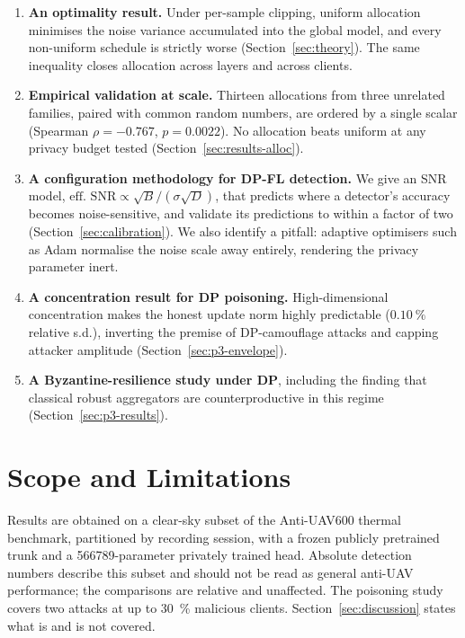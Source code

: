 \begin{enumerate}
  \item \textbf{An optimality result.} Under per-sample clipping, uniform
  allocation minimises the noise variance accumulated into the global model, and
  every non-uniform schedule is strictly worse (Section~\ref{sec:theory}). The
  same inequality closes allocation across layers and across clients.

  \item \textbf{Empirical validation at scale.} Thirteen allocations from three
  unrelated families, paired with common random numbers, are ordered by a single
  scalar (Spearman $\rho=-0.767$, $p=0.0022$). No allocation beats uniform at any
  privacy budget tested (Section~\ref{sec:results-alloc}).

  \item \textbf{A configuration methodology for DP-FL detection.} We give an
  SNR model, $\text{eff.\ SNR}\propto \sqrt{B}/(\sigma\sqrt{D})$, that predicts
  where a detector's accuracy becomes noise-sensitive, and validate its
  predictions to within a factor of two (Section~\ref{sec:calibration}). We also
  identify a pitfall: adaptive optimisers such as Adam normalise the noise scale
  away entirely, rendering the privacy parameter inert.

  \item \textbf{A concentration result for DP poisoning.} High-dimensional
  concentration makes the honest update norm highly predictable
  ($\SI{0.10}{\percent}$ relative s.d.), inverting the premise of DP-camouflage
  attacks and capping attacker amplitude (Section~\ref{sec:p3-envelope}).

  \item \textbf{A Byzantine-resilience study under DP}, including the finding
  that classical robust aggregators are counterproductive in this regime
  (Section~\ref{sec:p3-results}).
\end{enumerate}

\section{Scope and Limitations}

Results are obtained on a clear-sky subset of the Anti-UAV600 thermal benchmark,
partitioned by recording session, with a frozen publicly pretrained trunk and a
\num{566789}-parameter privately trained head. Absolute detection numbers
describe this subset and should not be read as general anti-UAV performance; the
comparisons are relative and unaffected. The poisoning study covers two attacks
at up to \SI{30}{\percent} malicious clients. Section~\ref{sec:discussion} states
what is and is not covered.


